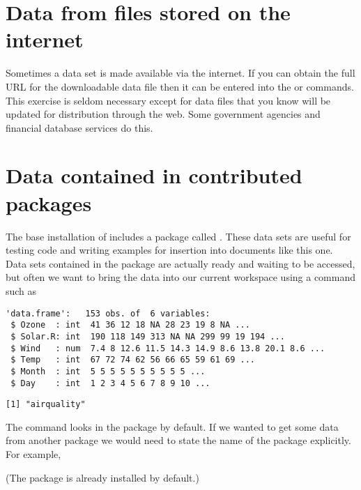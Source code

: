 \section{Data from files stored on the internet} 
 
Sometimes a data set is made available via the internet. If you can obtain the full URL for the downloadable data file then it can be entered into the  or  commands. This exercise is seldom necessary except for data files that you know will be updated for distribution through the web. Some government agencies and financial database services do this. 
 
\section{Data contained in contributed packages} 
\label{DataFromPackages} 
 
 
The base installation of \R{} includes a package called . These data sets are useful for testing code and writing examples for insertion into documents like this one. Data sets contained in the  package are actually ready and waiting to be accessed, but often we want to bring the data into our current workspace using a command such as 
\begin{knitrout}
\color{fgcolor}\begin{kframe}
\begin{alltt}
\hlstd{> }
\hlstd{> }
\end{alltt}
\begin{verbatim}
'data.frame':	153 obs. of  6 variables:
 $ Ozone  : int  41 36 12 18 NA 28 23 19 8 NA ...
 $ Solar.R: int  190 118 149 313 NA NA 299 99 19 194 ...
 $ Wind   : num  7.4 8 12.6 11.5 14.3 14.9 8.6 13.8 20.1 8.6 ...
 $ Temp   : int  67 72 74 62 56 66 65 59 61 69 ...
 $ Month  : int  5 5 5 5 5 5 5 5 5 5 ...
 $ Day    : int  1 2 3 4 5 6 7 8 9 10 ...
\end{verbatim}
\begin{alltt}
\hlstd{> }\hlstd{()}
\end{alltt}
\begin{verbatim}
[1] "airquality"
\end{verbatim}
\end{kframe}
\end{knitrout}
The  command looks in the  package by default. If we wanted to get some data from another package we would need to state the name of the package explicitly. For example, 
\begin{knitrout}
\color{fgcolor}\begin{kframe}
\begin{alltt}
\hlstd{> } \hlstd{=}\hlstd{)}
\end{alltt}
\end{kframe}
\end{knitrout}
(The  package is already installed by default.)  
 
